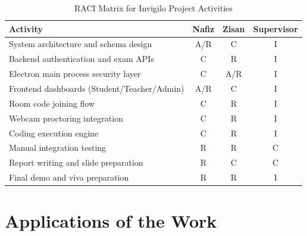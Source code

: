 \documentclass[12pt, a4paper]{report}
\begin{document}
\begin{table}[H]
  \caption{RACI Matrix for Invigilo Project Activities}
  \label{tab:1.2}
  \centering
  {\fontsize{11}{14}\selectfont
    \begin{tabular}{|p{2in}|c|c|c|}
      \hline
      \textbf{Activity} & \textbf{Nafiz} & \textbf{Zisan} & \textbf{Supervisor} \\
      \hline
      System architecture and schema design & A/R & C & I \\
      \hline
      Backend authentication and exam APIs & C & R & I \\
      \hline
      Electron main process security layer & C & A/R & I \\
      \hline
      Frontend dashboards (Student/Teacher/Admin) & A/R & C & I \\
      \hline
      Room code joining flow & C & R & I \\
      \hline
      Webcam proctoring integration & C & R & I \\
      \hline
      Coding execution engine & C & R & I \\
      \hline
      Manual integration testing & R & R & C \\
      \hline
      Report writing and slide preparation & R & C & C \\
      \hline
      Final demo and viva preparation & R & R & I \\
      \hline
    \end{tabular}
  }
\end{table}

\section{Applications of the Work}
\end{document}
